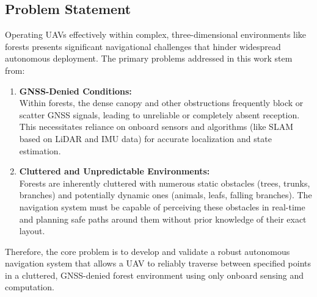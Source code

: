         \subsection{Problem Statement}
            Operating UAVs effectively within complex, three-dimensional environments like forests presents significant navigational challenges that hinder widespread autonomous deployment. 
            The primary problems addressed in this work stem from:
            \begin{enumerate}
                \item \textbf{\ac{GNSS}-Denied Conditions: } \\
                Within forests, the dense canopy and other obstructions frequently block or scatter \ac{GNSS} signals, leading to unreliable or completely absent reception.
                This necessitates reliance on onboard sensors and algorithms (like \ac{SLAM} based on \ac{LiDAR} and \ac{IMU} data) for accurate localization and state estimation.
                \item \textbf{Cluttered and Unpredictable Environments: } \\
                Forests are inherently cluttered with numerous static obstacles (trees, trunks, branches) and potentially dynamic ones (animals, leafs, falling branches). 
                The navigation system must be capable of perceiving these obstacles in real-time and planning safe paths around them without prior knowledge of their exact layout.
            \end{enumerate}
            Therefore, the core problem is to develop and validate a robust autonomous navigation system that allows a UAV to reliably traverse between specified points in a cluttered, GNSS-denied forest environment using only onboard sensing and computation.

